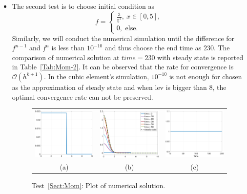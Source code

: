\documentclass[preprint,11pt]{elsarticle}
\begin{document}
\begin{itemize}
\item The second test is to choose initial condition as 
$$
f = \begin{cases}
\frac{3}{5^3},\ x\in[0,5],\\
0,\text{ else}.
\end{cases}
$$
Similarly, we will conduct the numerical simulation until the difference for $f^{n-1}$ and $f^n$ is less than $10^{-10}$ and thus choose the end time as $230$. The comparison of numerical solution at $time = 230$ with steady state is reported in Table~\ref{Tab:Mom-2}. It can be observed that the rate for convergence is $\mathcal{O}(h^{k+1})$. In the cubic element's simulation, $10^{-10}$ is not enough for chosen as the approximation of steady state and when lev is bigger than 8, the optimal convergence rate can not be preserved.
\begin{figure}[H]
\centering
\begin{tabular}{ccc}
\includegraphics[width=.3\textwidth]{./NumFig/Ini-Mom-2-zoom}
&\includegraphics[width=.3\textwidth]{./NumFig/Ini-Mom-2}
&\includegraphics[width=.3\textwidth]{./NumFig/Ini-Mom-2-Conv.png}\\
(a) & (b) & (c)
\end{tabular}
\caption{Test~\ref{Sect:Mom}: Plot of numerical solution.}\label{Fig:Mom}
\end{figure}
\end{itemize}
\end{document}
